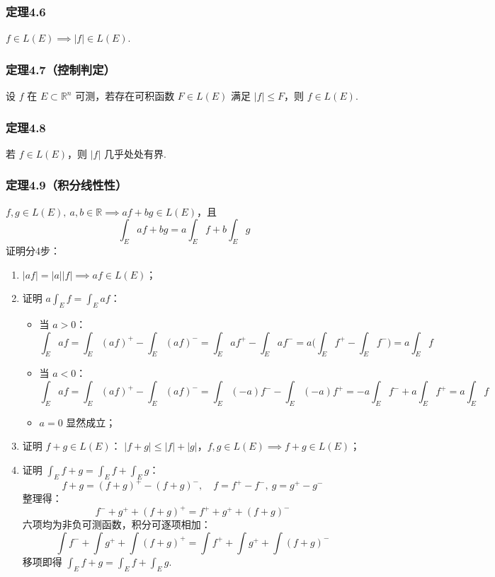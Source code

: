 \documentclass{article}
\begin{document}
	\subsubsection{定理4.6}
	$f\in L(E) \implies |f|\in L(E)$.
	
	\subsubsection{定理4.7（控制判定）}
	设 $f$ 在 $E\subset\mathbb{R}^n$ 可测，若存在可积函数 $F\in L(E)$ 满足 $|f|\le F$，则 $f\in L(E)$.
	
	\subsubsection{定理4.8}
	若 $f\in L(E)$，则 $|f|$ 几乎处处有界.
	
	\subsubsection{定理4.9（积分线性性）}
	$f,g\in L(E),\ a,b\in\mathbb{R} \implies af+bg\in L(E)$，且
	\[
	\displaystyle \int_E af + bg = a\int_E f + b\int_E g
	\]
	证明分4步：
	\begin{enumerate}
		\item $|af|=|a||f| \implies af\in L(E)$；
		\item 证明 $\displaystyle a\int_E f = \int_E af$：
		\begin{itemize}
			\item 当 $a>0$：
			\[
			\int_E af
			= \int_E (af)^+ - \int_E (af)^-
			= \int_E a f^+ - \int_E a f^-
			= a\Big(\int_E f^+ - \int_E f^-\Big)
			= a\int_E f
			\]
			\item 当 $a<0$：
			\[
			\int_E af
			= \int_E (af)^+ - \int_E (af)^-
			= \int_E (-a)f^- - \int_E (-a)f^+
			= -a\int_E f^- + a\int_E f^+
			= a\int_E f
			\]
			\item $a=0$ 显然成立；
		\end{itemize}
		\item 证明 $f+g\in L(E)$：
		$|f+g|\le |f|+|g|$，$f,g\in L(E) \implies f+g\in L(E)$；
		\item 证明 $\displaystyle \int_E f+g = \int_E f + \int_E g$：
		\[
		f+g = (f+g)^+ - (f+g)^-,\quad
		f = f^+ - f^-,\ g = g^+ - g^-
		\]
		整理得：
		\[
		f^- + g^+ + (f+g)^+ = f^+ + g^+ + (f+g)^-
		\]
		六项均为非负可测函数，积分可逐项相加：
		\[
		\int f^- + \int g^+ + \int (f+g)^+
		= \int f^+ + \int g^+ + \int (f+g)^-
		\]
		移项即得 $\displaystyle \int_E f+g = \int_E f + \int_E g$.
	\end{enumerate}
	
\end{document}
